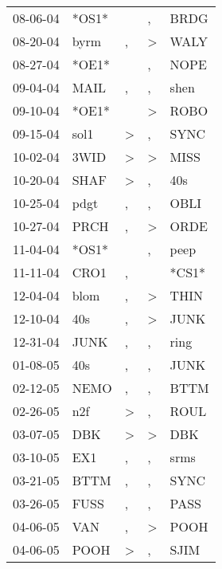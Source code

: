 \begin{supertabular}{lllll}
 08-06-04 &  *OS1* &                  &                , &   BRDG \\
 08-20-04 &   byrm &                , &     \textgreater &   WALY \\
 08-27-04 &  *OE1* &                  &                , &   NOPE \\
 09-04-04 &   MAIL &                , &                , &   shen \\
 09-10-04 &  *OE1* &                  &     \textgreater &   ROBO \\
 09-15-04 &   sol1 &     \textgreater &                , &   SYNC \\
 10-02-04 &   3WID &     \textgreater &     \textgreater &   MISS \\
 10-20-04 &   SHAF &     \textgreater &                , &    40s \\
 10-25-04 &   pdgt &                , &                , &   OBLI \\
 10-27-04 &   PRCH &                , &     \textgreater &   ORDE \\
 11-04-04 &  *OS1* &                  &                , &   peep \\
 11-11-04 &   CRO1 &                , &                  &  *CS1* \\
 12-04-04 &   blom &                , &     \textgreater &   THIN \\
 12-10-04 &    40s &                , &     \textgreater &   JUNK \\
 12-31-04 &   JUNK &                , &                , &   ring \\
 01-08-05 &    40s &                , &                , &   JUNK \\
 02-12-05 &   NEMO &                , &                , &   BTTM \\
 02-26-05 &    n2f &     \textgreater &                , &   ROUL \\
 03-07-05 &    DBK &     \textgreater &     \textgreater &    DBK \\
 03-10-05 &    EX1 &                , &                , &   srms \\
 03-21-05 &   BTTM &                , &                , &   SYNC \\
 03-26-05 &   FUSS &                , &                , &   PASS \\
 04-06-05 &    VAN &                , &     \textgreater &   POOH \\
 04-06-05 &   POOH &     \textgreater &                , &   SJIM \\

\end{supertabular}
